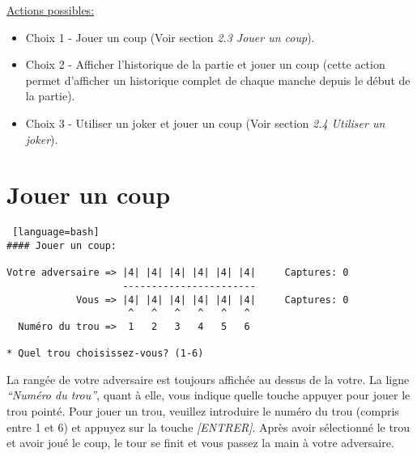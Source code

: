 \documentclass[11pt,a4paper]{report}
\begin{document}
            \begin{flushleft}
                \underline{Actions possibles:} \newline
                \begin{itemize}\renewcommand{\labelitemi}{$\bullet$}
                    \item Choix 1 - Jouer un coup (Voir section \textit{2.3 Jouer un coup}).
                    \item Choix 2 - Afficher l'historique de la partie et jouer un coup (cette action permet d’afficher un historique complet de chaque manche depuis le début de la partie).
                    \item Choix 3 - Utiliser un joker et jouer un coup (Voir section \textit{2.4 Utiliser un joker}).
                \end{itemize}
            \end{flushleft}

        \section{Jouer un coup}

\begin{lstlisting} [language=bash]
#### Jouer un coup:

Votre adversaire => |4| |4| |4| |4| |4| |4|     Captures: 0
                    -----------------------
            Vous => |4| |4| |4| |4| |4| |4|     Captures: 0
                     ^   ^   ^   ^   ^   ^
  Numéro du trou =>  1   2   3   4   5   6

* Quel trou choisissez-vous? (1-6)
\end{lstlisting}

            \begin{flushleft}
                La rangée de votre adversaire est toujours affichée au dessus de la votre. La ligne \textit{“Numéro du trou”}, quant à elle, vous indique quelle touche appuyer pour jouer le trou pointé.\newline\newline
                Pour jouer un trou, veuillez introduire le numéro du trou (compris entre 1 et 6) et appuyez sur la touche \textit{[ENTRER]}.
                \newline\newline
                Après avoir sélectionné le trou et avoir joué le coup, le tour se finit et vous passez la main à votre adversaire.
            \end{flushleft}
\end{document}
